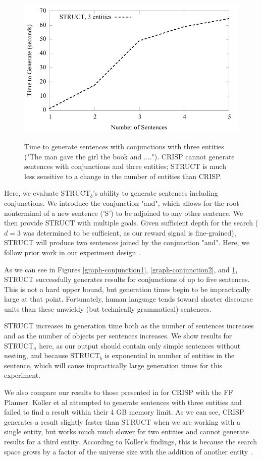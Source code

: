 \begin{figure}
\centering
\includegraphics[width=0.7 \linewidth]{../analysis/struct/conjunction/conjunction3.pdf}
\label{graph-conjunction3}
\caption{Time to generate sentences with conjunctions with three entities ("The man gave the girl the book and ....").
CRISP cannot generate sentences with conjunctions and three entities; STRUCT is much less sensitive to a change
in the number of entities than CRISP.}
\end{figure}

Here, we evaluate STRUCT$_b$'s ability to generate sentences including
conjunctions.  We introduce the conjunction "and", which allows for the
root nonterminal of a new sentence ('S') to be adjoined to any other sentence.
We then provide STRUCT with multiple goals.  Given sufficient depth for the
search ($d=3$ was determined to be sufficient, as our reward signal is fine-grained),
STRUCT will produce two sentences joined by the conjunction "and".
Here, we follow prior work in our experiment design \cite{koller_experiences_2011}.

As we can see in Figures \ref{graph-conjunction1}, \ref{graph-conjunction2}, and
\ref{graph-conjunction3}, STRUCT successfully generates results
for conjunctions of up to five sentences.  This is not a hard upper bound, but
generation times begin to be impractically large at that point.
Fortunately, human language tends toward
shorter discourse units than these unwieldy (but technically grammatical) sentences.

STRUCT increases in generation time both as the number of sentences increases and as
the number of objects per sentences increases.  We show results for STRUCT$_a$ here,
as our output should contain only simple sentences without nesting, and because
STRUCT$_b$ is exponential in number of entities in the sentence, which will cause
impractically large generation times for this experiment.

We also compare our results to those presented in \cite{koller_experiences_2011} for
CRISP with the FF Planner.  Koller et al attempted to generate sentences with
three entities and failed to find a result within their 4 GB memory limit.  As we
can see, CRISP generates a result slightly faster than STRUCT when we are 
working with a single entity, but works much much slower for two entities
and cannot generate results for a third entity.  According to Koller's findings,
this is because the search space grows by a factor of the universe size with
the addition of another entity \cite{koller_experiences_2011}.

